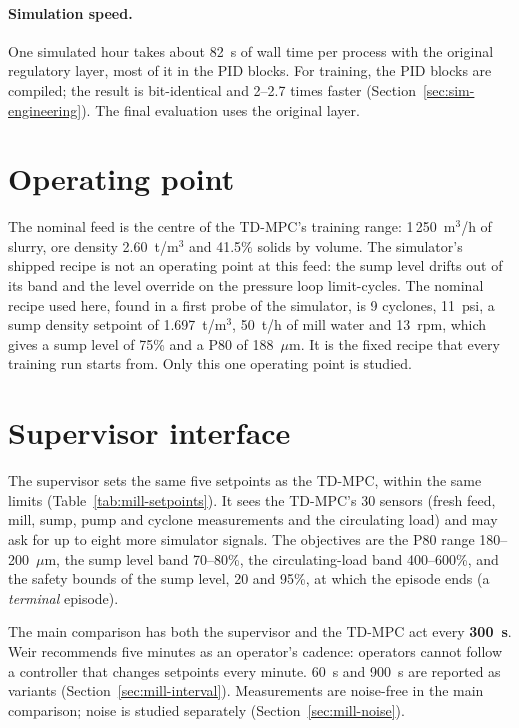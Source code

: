 \paragraph{Simulation speed.} One simulated hour takes about 82~s of wall time
per process with the original regulatory layer, most of it in the PID blocks.
For training, the PID blocks are compiled; the result is bit-identical and
2--2.7 times faster (Section~\ref{sec:sim-engineering}). The final evaluation
uses the original layer.

\section{Operating point}
\label{sec:mill-operating-point}
The nominal feed is the centre of
the TD-MPC's training range: 1\,250~m$^3$/h of slurry, ore density
2.60~t/m$^3$ and 41.5\% solids by volume. The simulator's shipped recipe is not
an operating point at this feed: the sump level drifts out of its band and the
level override on the pressure loop limit-cycles. The nominal recipe used here,
found in a first probe of the simulator, is 9 cyclones, 11~psi, a sump density
setpoint of 1.697~t/m$^3$, 50~t/h of mill water and 13~rpm, which gives a sump
level of 75\% and a P80 of 188~$\mu$m. It is the fixed recipe that every
training run starts from. Only this one operating point is studied.

\section{Supervisor interface}
\label{sec:mill-interface}
The supervisor sets the same five setpoints as the TD-MPC, within the same
limits (Table~\ref{tab:mill-setpoints}). It sees the TD-MPC's 30 sensors
(fresh feed, mill, sump, pump and cyclone measurements and the circulating
load) and may ask for up to eight more simulator signals. The objectives are
the P80 range 180--200~$\mu$m, the sump level band 70--80\%, the
circulating-load band 400--600\%, and the safety bounds of the sump level, 20
and 95\%, at which the episode ends (a \emph{terminal} episode).

The main comparison has both the supervisor and the TD-MPC act every
\textbf{300~s}. Weir recommends five minutes as an operator's cadence: operators
cannot follow a controller that changes setpoints every minute. 60~s and 900~s
are reported as variants (Section~\ref{sec:mill-interval}). Measurements are
noise-free in the main comparison; noise is studied separately
(Section~\ref{sec:mill-noise}).

